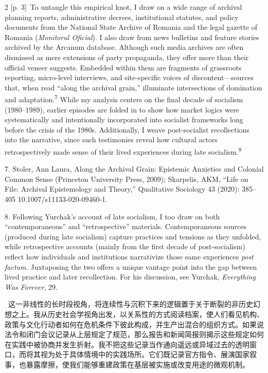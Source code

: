 \documentclass[10pt,a4paper]{article}
\begin{document}
\begin{paracol}{2}
\switchcolumn
{\scriptsize\color{gray} [p. 3]}\ To untangle this empirical knot, I draw on a wide range of archival planning reports, administrative decrees, institutional statutes, and policy documents from the National State Archive of Romania and the legal gazette of Romania (\textit{Monitorul Oficial}). I also draw from news bulletins and feature stories archived by the Arcanum database. Although such media archives are often dismissed as mere extensions of party propaganda, they offer more than their official veneer suggests. Embedded within them are fragments of grassroots reporting, micro-level interviews, and site-specific voices of discontent—sources that, when read “along the archival grain,” illuminate intersections of domination and adaptation.\nobreak\textsuperscript{7} While my analysis centers on the final decade of socialism (1980–1989), earlier episodes are folded in to show how market logics were systematically and intentionally incorporated into socialist frameworks long before the crisis of the 1980s. Additionally, I weave post-socialist recollections into the narrative, since such testimonies reveal how cultural actors retrospectively made sense of their lived experiences during late socialism.\nobreak\textsuperscript{8}\par{\small 7. Stoler, Ann Laura, Along the Archival Grain: Epistemic Anxieties and Colonial Common Sense (Princeton University Press, 2009); Skarpelis, AKM, “Life on File: Archival Epistemology and Theory,” Qualitative Sociology 43 (2020): 385–405 10.1007/s11133-020-09460-1.\par}{\small 8. Following Yurchak’s account of late socialism, I too draw on both “contemporaneous” and “retrospective” materials. Contemporaneous sources (produced during late socialism) capture practices and tensions as they unfolded, while retrospective accounts (mainly from the first decade of post-socialism) reflect how individuals and institutions narrativize those same experiences \textit{post factum.} Juxtaposing the two offers a unique vantage point into the gap between lived practice and later recollection. For his discussion, see Yurchak, \textit{Everything Was Forever}, 29.\par}
\switchcolumn*
{\scriptsize\color{gray} [p. 4]}\ 这一非线性的长时段视角，将连续性与沉积下来的逻辑置于关于断裂的非历史幻想之上。我从历史社会学视角出发，以关系性的方式阅读档案，使人们看见机构、政策与文化行动者如何在危机条件下彼此构成，并生产出混合的组织方式。如果说法令和闭门会议记录从上层规定了规范，那么报告和新闻简报则揭示这些规定如何在实践中被协商并发生折射。我不把这些记录当作通向遥远或异域过去的透明窗口，而将其视为处于具体情境中的实践场所。它们既记录官方指令、展演国家叙事，也暴露摩擦，使我们能够重建政策在基层被实施或改变用途的微观机制。\par

\end{paracol}
\end{document}
